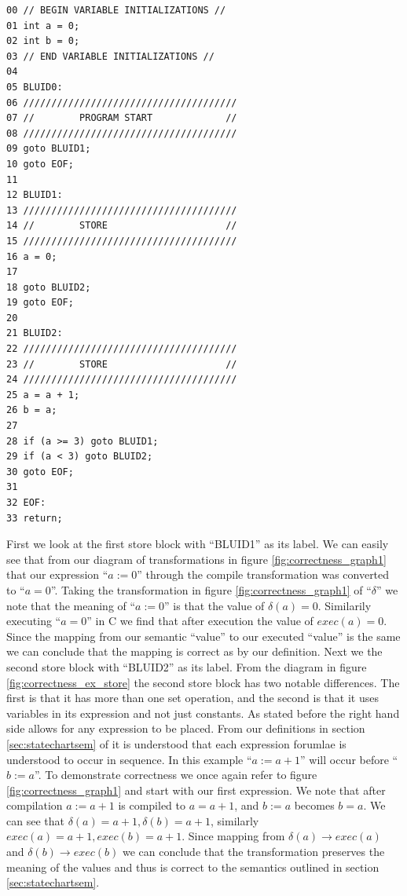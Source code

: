 \begin{minipage}{\textwidth}
\begin{lstlisting}[frame=single]
00 // BEGIN VARIABLE INITIALIZATIONS //
01 int a = 0;
02 int b = 0;
03 // END VARIABLE INITIALIZATIONS //
04
05 BLUID0:
06 //////////////////////////////////////
07 //        PROGRAM START             //
08 //////////////////////////////////////
09 goto BLUID1;
10 goto EOF;
11
12 BLUID1:
13 //////////////////////////////////////
14 //        STORE                     //
15 //////////////////////////////////////
16 a = 0;
17 
18 goto BLUID2;
19 goto EOF;
20
21 BLUID2:
22 //////////////////////////////////////
23 //        STORE                     //
24 //////////////////////////////////////
25 a = a + 1;
26 b = a;
27
28 if (a >= 3) goto BLUID1;
29 if (a < 3) goto BLUID2;
30 goto EOF;
31
32 EOF:
33 return;
\end{lstlisting}
\end{minipage}

First we look at the first store block with ``BLUID1'' as its label. We can easily see that from our diagram
of transformations in figure \ref{fig:correctness_graph1} that our expression ``$a := 0$'' through the compile
transformation was converted to ``$a = 0$''. Taking the transformation in figure \ref{fig:correctness_graph1}
of ``$\delta$'' we note that the meaning of ``$a := 0$'' is that the value of $\delta(a) = 0$. Similarily
executing ``$a = 0$'' in C we find that after execution the value of $exec(a) = 0$. Since the mapping from
our semantic ``value'' to our executed ``value'' is the same we can conclude that the mapping is correct as
by our definition. Next we the second store block with ``BLUID2'' as its label. From the diagram in figure
\ref{fig:correctness_ex_store} the second store block has two notable differences. The first is that it has
more than one set operation, and the second is that it uses variables in its expression and not just constants.
As stated before the right hand side allows for any expression to be placed. From our definitions in
section \ref{sec:statechartsem} of \plcchart it is understood that each expression forumlae is understood
to occur in sequence. In this example ``$a := a + 1$'' will occur before ``$b := a$''. To demonstrate
correctness we once again refer to figure \ref{fig:correctness_graph1} and start with our first expression.
We note that after compilation $a := a + 1$ is compiled to $a = a + 1$, and $b := a$ becomes $b = a$. We
can see that $\delta(a) = a + 1, \delta(b) = a + 1$, similarly $exec(a) = a + 1, exec(b) = a + 1$. Since
mapping from $\delta(a) \rightarrow exec(a)$ and $\delta(b) \rightarrow exec(b)$ we can conclude that the
transformation preserves the meaning of the values and thus is correct to the semantics outlined in
section \ref{sec:statechartsem}.

